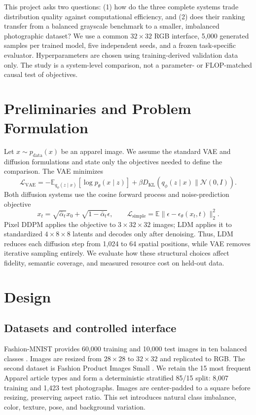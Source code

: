 \documentclass{article}
\begin{document}
This project asks two questions: (1) how do the three complete systems trade distribution quality against computational efficiency, and (2) does their ranking transfer from a balanced grayscale benchmark to a smaller, imbalanced photographic dataset? We use a common $32\times32$ RGB interface, 5,000 generated samples per trained model, five independent seeds, and a frozen task-specific evaluator. Hyperparameters are chosen using training-derived validation data only. The study is a system-level comparison, not a parameter- or FLOP-matched causal test of objectives.

\section{Preliminaries and Problem Formulation}
Let $x\sim p_{\mathrm{data}}(x)$ be an apparel image. We assume the standard VAE and diffusion formulations and state only the objectives needed to define the comparison. The VAE minimizes
\begin{equation}
\mathcal{L}_{\mathrm{VAE}}=-\mathbb{E}_{q_\phi(z\mid x)}[\log p_\theta(x\mid z)]+\beta D_{\mathrm{KL}}(q_\phi(z\mid x)\|\mathcal{N}(0,I)).
\end{equation}
Both diffusion systems use the cosine forward process \citep{nichol2021improved} and noise-prediction objective
\begin{equation}
x_t=\sqrt{\bar\alpha_t}x_0+\sqrt{1-\bar\alpha_t}\epsilon,
\qquad
\mathcal{L}_{\mathrm{simple}}=\mathbb{E}\|\epsilon-\epsilon_\theta(x_t,t)\|_2^2.
\end{equation}
Pixel DDPM applies the objective to $3\times32\times32$ images; LDM applies it to standardized $4\times8\times8$ latents and decodes only after denoising. Thus, LDM reduces each diffusion step from 1,024 to 64 spatial positions, while VAE removes iterative sampling entirely. We evaluate how these structural choices affect fidelity, semantic coverage, and measured resource cost on held-out data.

\section{Design}
\subsection{Datasets and controlled interface}
Fashion-MNIST provides 60,000 training and 10,000 test images in ten balanced classes \citep{xiao2017fashion}. Images are resized from $28\times28$ to $32\times32$ and replicated to RGB. The second dataset is Fashion Product Images Small \citep{fpis}. We retain the 15 most frequent Apparel article types and form a deterministic stratified 85/15 split: 8,007 training and 1,423 test photographs. Images are center-padded to a square before resizing, preserving aspect ratio. This set introduces natural class imbalance, color, texture, pose, and background variation.
\end{document}

